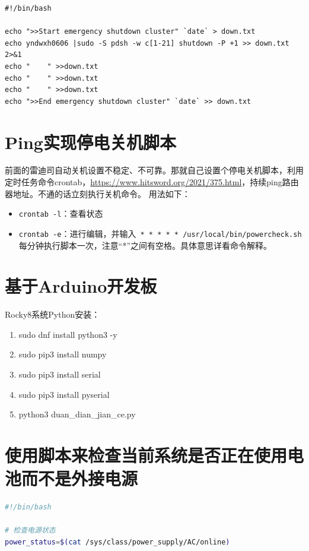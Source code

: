 {\begin{verbatim}
#!/bin/bash

echo ">>Start emergency shutdown cluster" `date` > down.txt
echo yndwxh0606 |sudo -S pdsh -w c[1-21] shutdown -P +1 >> down.txt 2>&1
echo "    " >>down.txt
echo "    " >>down.txt
echo "    " >>down.txt
echo ">>End emergency shutdown cluster" `date` >> down.txt
\end{verbatim}



\section{Ping实现停电关机脚本}
前面的雷迪司自动关机设置不稳定、不可靠。那就自己设置个停电关机脚本，利用定时任务命令crontab，\url{https://www.hitsword.org/2021/375.html}，持续ping路由器地址。不通的话立刻执行关机命令。
用法如下：
\begin{itemize}
\item \verb|crontab -l|：查看状态
\item \verb|crontab -e|：进行编辑，并输入\verb| * * * * * /usr/local/bin/powercheck.sh|
每分钟执行脚本一次，注意“*”之间有空格。具体意思详看命令解释。
\end{itemize}






\section{基于Arduino开发板}
Rocky8系统Python安装：
\begin{enumerate}
\item sudo dnf install python3 -y
\item sudo pip3 install numpy
\item sudo pip3 install serial
\item sudo pip3 install pyserial
\item python3 duan\_dian\_jian\_ce.py
\end{enumerate}



\section{使用脚本来检查当前系统是否正在使用电池而不是外接电源}
 \begin{lstlisting}[language=sh]
#!/bin/bash

# 检查电源状态
power_status=$(cat /sys/class/power_supply/AC/online)


\end{lstlisting}}
